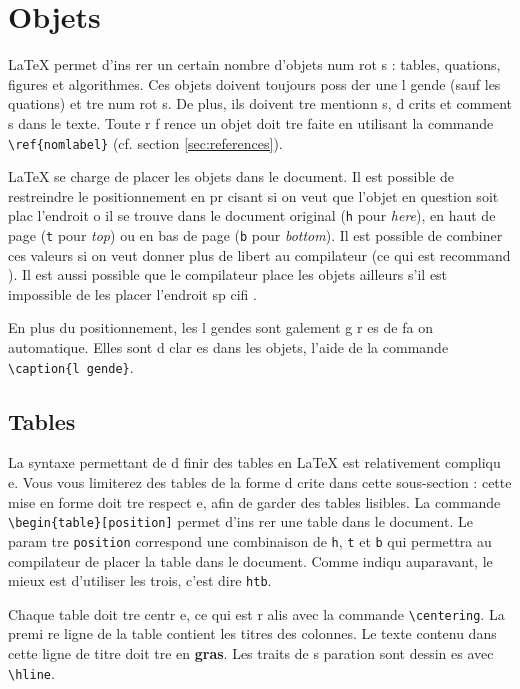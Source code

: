 \documentclass{article}
\begin{document}
\section{Objets}
\label{sec:objets}
\LaTeX{} permet d'ins rer un certain nombre d'objets num rot s : tables,  quations, figures et algorithmes. Ces objets doivent toujours poss der une l gende (sauf les  quations) et  tre num rot s. De plus, ils doivent  tre mentionn s, d crits et comment s dans le texte. Toute r f rence   un objet doit  tre faite en utilisant la commande \texttt{\textbackslash{}ref\{nomlabel\}} (cf\@. section \ref{sec:references}).
	 
\LaTeX{} se charge de placer les objets dans le document. Il est possible de restreindre le positionnement en pr cisant si on veut que l'objet en question soit plac    l'endroit o  il se trouve dans le document original (\texttt{h} pour \textit{here}), en haut de page (\texttt{t} pour \textit{top}) ou en bas de page (\texttt{b} pour \textit{bottom}). Il est possible de combiner ces valeurs si on veut donner plus de libert  au compilateur (ce qui est recommand ). Il est aussi possible que le compilateur place les objets ailleurs s'il est impossible de les placer   l'endroit sp cifi .
	
En plus du positionnement, les l gendes sont  galement g r es de fa on automatique. Elles sont d clar es dans les objets,   l'aide de la commande \texttt{\textbackslash{}caption\{l gende\}}.
	
\subsection{Tables}
\label{sec:tables}
La syntaxe permettant de d finir des tables en \LaTeX{} est relativement compliqu e. Vous vous limiterez   des tables de la forme d crite dans cette sous-section : cette mise en forme doit  tre respect e, afin de garder des tables lisibles. La commande \texttt{\textbackslash{}begin\{table\}[position]} permet d'ins rer une table dans le document. Le param tre \texttt{position} correspond   une combinaison de \texttt{h}, \texttt{t} et \texttt{b} qui permettra au compilateur de placer la table dans le document. Comme indiqu  auparavant, le mieux est d'utiliser les trois, c'est   dire \texttt{htb}.
	
Chaque table doit  tre centr e, ce qui est r alis  avec la commande \texttt{\textbackslash{}centering}. La premi re ligne de la table contient les titres des colonnes. Le texte contenu dans cette ligne de titre doit  tre en \textbf{gras}. Les traits de s paration sont dessin es avec \texttt{\textbackslash{}hline}.
	
\end{document}

